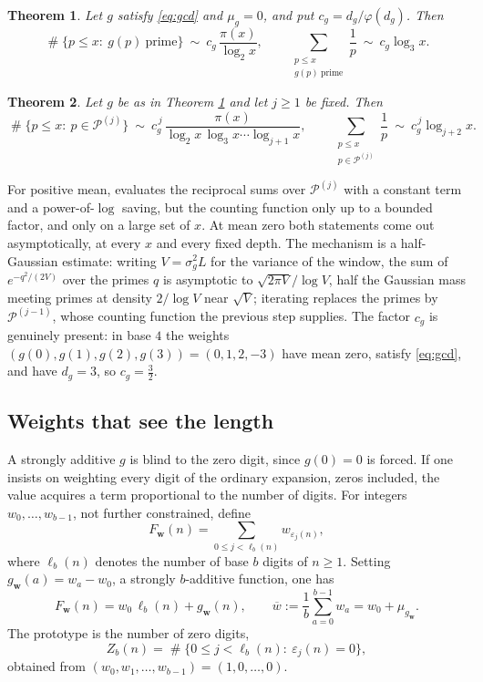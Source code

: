 \documentclass[11pt,reqno]{amsart}
\theoremstyle{plain}
\newtheorem{theorem}{Theorem}[section]
\theoremstyle{definition}
\DeclareMathOperator{\Card}{\#}
\begin{document}
\begin{theorem}\label{thm:zeromean}
Let $g$ satisfy \eqref{eq:gcd} and $\mu_g=0$, and put $c_g=d_g/\varphi(d_g)$. Then
\[
\Card\{p\le x:\ g(p)\ \text{prime}\}\ \sim\ c_g\,\frac{\pi(x)}{\log_2x},
\qquad
\sum_{\substack{p\le x\\ g(p)\ \text{prime}}}\frac1p\ \sim\ c_g\log_3x .
\]
\end{theorem}

\begin{theorem}\label{thm:iterates}
Let $g$ be as in Theorem \ref{thm:zeromean} and let $j\ge1$ be fixed. Then
\begin{equation}\label{eq:iterates}
\Card\{p\le x:\ p\in\mathcal P^{(j)}\}\ \sim\ c_g^{\,j}\,\frac{\pi(x)}{\log_2x\,\log_3x\cdots\log_{j+1}x},
\qquad
\sum_{\substack{p\le x\\ p\in\mathcal P^{(j)}}}\frac1p\ \sim\ c_g^{\,j}\log_{j+2}x .
\end{equation}
\end{theorem}

For positive mean, \cite{vibefrtz} evaluates the reciprocal sums over $\mathcal P^{(j)}$ with a constant term and a power-of-$\log$ saving, but the counting function only up to a bounded factor, and only on a large set of $x$. At mean zero both statements come out asymptotically, at every $x$ and every fixed depth. The mechanism is a half-Gaussian estimate: writing $V=\sigma_g^{2}L$ for the variance of the window, the sum of $e^{-q^{2}/(2V)}$ over the primes $q$ is asymptotic to $\sqrt{2\pi V}/\log V$, half the Gaussian mass meeting primes at density $2/\log V$ near $\sqrt V$; iterating replaces the primes by $\mathcal P^{(j-1)}$, whose counting function the previous step supplies. The factor $c_g$ is genuinely present: in base $4$ the weights $(g(0),g(1),g(2),g(3))=(0,1,2,-3)$ have mean zero, satisfy \eqref{eq:gcd}, and have $d_g=3$, so $c_g=\tfrac32$.
\subsection{Weights that see the length}
A strongly additive $g$ is blind to the zero digit, since $g(0)=0$ is forced. If one insists on weighting every digit of the ordinary expansion, zeros included, the value acquires a term proportional to the number of digits. For integers $w_0,\dots,w_{b-1}$, not further constrained, define
\begin{equation}\label{eq:Fw}
F_{\mathbf w}(n)=\sum_{0\le j<\ell_b(n)}w_{\varepsilon_j(n)},
\end{equation}
where $\ell_b(n)$ denotes the number of base $b$ digits of $n\ge1$. Setting $g_{\mathbf w}(a)=w_a-w_0$, a strongly $b$-additive function, one has
\begin{equation}\label{eq:split}
F_{\mathbf w}(n)=w_0\,\ell_b(n)+g_{\mathbf w}(n),
\qquad
\overline w:=\frac1b\sum_{a=0}^{b-1}w_a=w_0+\mu_{g_{\mathbf w}} .
\end{equation}
The prototype is the number of zero digits,
\[
Z_b(n)=\Card\{0\le j<\ell_b(n):\ \varepsilon_j(n)=0\},
\]
obtained from $(w_0,w_1,\dots,w_{b-1})=(1,0,\dots,0)$.
\end{document}
